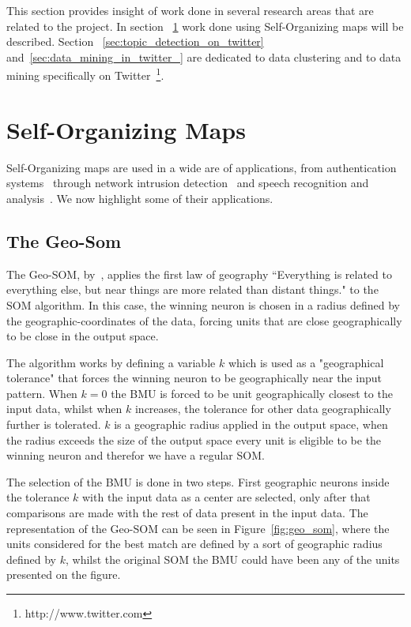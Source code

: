 
This section provides insight of work done in several research areas that are related to the project. In section ~\ref{sec:self_organizing_maps} work done using Self-Organizing maps will be described. Section ~\ref{sec:topic_detection_on_twitter} and~\ref{sec:data_mining_in_twitter_} are dedicated to data clustering and to data mining specifically on Twitter~\footnote{http://www.twitter.com}.

\section{Self-Organizing Maps} 
\label{sec:self_organizing_maps}
Self-Organizing maps are used in a wide are of applications, from authentication systems~\cite{Dozono2012} through network intrusion detection~\cite{intrusion_som} and speech recognition and analysis~\cite{phonetic_typewiter}. We now highlight some of their applications.

\subsection{The Geo-Som} 
\label{sub:types_of_soms}
The Geo-SOM, by~\citet{Bacao2005}, applies the first law of geography “Everything is related to everything else, but near things are more related than distant things." to the \ac{SOM} algorithm. In this case, the winning neuron is chosen in a radius defined by the geographic-coordinates of the data, forcing units that are close geographically to be close in the output space.

The algorithm works by defining a variable $k$ which is used as a "geographical tolerance" that forces the winning neuron to be geographically near the input pattern. When $k=0$ the \ac{BMU} is forced to be unit geographically closest to the input data, whilst when $k$ increases, the tolerance for other data geographically further is tolerated. $k$ is a geographic radius applied in the output space, when the radius exceeds the size of the output space every unit is eligible to be the winning neuron and therefor we have a regular SOM.

The selection of the \ac{BMU} is done in two steps. First geographic neurons inside the tolerance $k$ with the input data as a center are selected, only after that comparisons are made with the rest of data present in the input data. The representation of the Geo-SOM can be seen in Figure~\ref{fig:geo_som}, where the units considered for the best match are defined by a sort of geographic radius defined by $k$, whilst the original \ac{SOM} the \ac{BMU} could have been any of the units presented on the figure.

